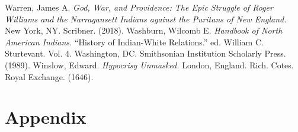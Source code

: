 \documentclass[11pt, oneside]{article}
\begin{document}
\begin{thebibliography}{1}
\smallskip
{} Warren, James A. {\em God, War, and Providence: The Epic Struggle of Roger Williams and the Narragansett Indians against the Puritans of New England.}  New York, NY. Scribner. (2018).
\smallskip
{} Washburn, Wilcomb E. {\em Handbook of North American Indians.} ``History of Indian-White Relations.'' ed. William C. Sturtevant. Vol. 4. Washington, DC. Smithsonian Institution Scholarly Press. (1989).
\smallskip
{} Winslow, Edward. {\em Hypocrisy Unmasked.}  London, England. Rich. Cotes. Royal Exchange. (1646).

\end{thebibliography}











\pagebreak
\appendix

\section{Appendix}
\end{document}
